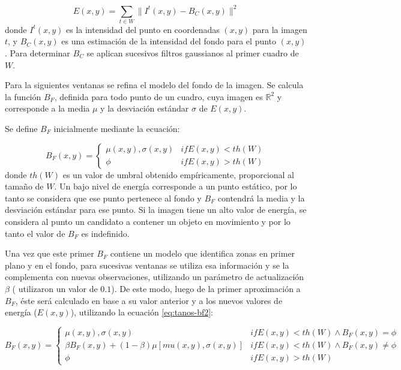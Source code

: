 \begin{equation}
    \label{eq:tanos-energy}
    E(x, y) = \sum_{t \in W} \| I^t(x, y) - B_C (x, y) \| ^2
\end{equation}
donde  $I^t(x, y)$ es la intensidad del punto en coordenadas $(x, y)$ para la
imagen $t$, y $B_C(x, y)$ es una estimación de la intensidad del fondo para el
punto $(x, y)$. Para determinar $B_C$ se aplican sucesivos filtros gaussianos
al primer cuadro de $W$.

Para la siguientes ventanas se refina el modelo del fondo de la imagen. Se
calcula la función $B_F$, definida para todo punto de un cuadro, cuya imagen es
$\mathbb{R}^2$ y corresponde a la media $\mu$ y la desviación estándar $\sigma$ de $E(x, y)$.

Se define $B_F$ inicialmente mediante la ecuación:

\begin{equation}
  \label{eq:tanos-bf1}
  B_F(x, y) =
  \begin{cases}
    \mu(x, y), \sigma(x, y) & if E(x, y) < th(W) \\
    \phi & if E(x, y) > th(W)
  \end{cases}
\end{equation}
donde $th(W)$ es un valor de umbral obtenido empíricamente, proporcional al
tamaño de $W$. Un bajo nivel de energía corresponde a un punto estático,
por lo tanto se considera que ese punto pertenece al fondo y $B_F$
contendrá la media y la desviación estándar para ese punto. Si la imagen
tiene un alto valor de energía, se considera al punto un candidato a
contener un objeto en movimiento y por lo tanto el valor de $B_F$ es
indefinido.

Una vez que este primer $B_F$ contiene un modelo que identifica zonas en primer
plano y en el fondo, para sucesivas ventanas se utiliza esa información y se la
complementa con nuevas observaciones, utilizando un parámetro de actualización
$\beta$ (\citeauthor*{papers-tanos} utilizaron un valor de $0.1$). De este
modo, luego de la primer aproximación a $B_F$, éste será calculado en base a su
valor anterior y a los nuevos valores de energía ($E(x, y)$), utilizando la
ecuación \ref{eq:tanos-bf2}:

\begin{equation} \label{eq:tanos-bf2}
  B_F(x, y) = \begin{cases}
    \mu(x, y), \sigma(x, y) & if E(x, y) < th(W) \wedge B_F(x, y) = \phi \\
    \beta B_F(x, y) + (1-\beta) \mu\left[mu(x, y), \sigma(x, y)\right] & if E(x, y) < th(W) \wedge B_F(x, y) \neq \phi \\
    \phi & if E(x, y) > th(W)
  \end{cases}
\end{equation}

